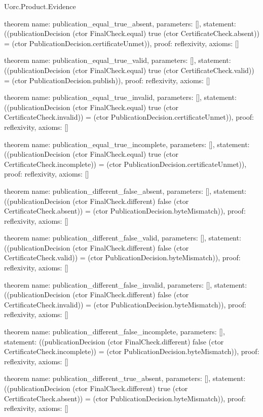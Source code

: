 \begin{lexlean}{Uorc.Product.Evidence}
\begin{semanticmodule}
theorem{
  name: publication_equal_true_absent,
  parameters: [],
  statement: ((publicationDecision (ctor FinalCheck.equal) true (ctor CertificateCheck.absent)) = (ctor PublicationDecision.certificateUnmet)),
  proof: reflexivity{},
  axioms: []
}

theorem{
  name: publication_equal_true_valid,
  parameters: [],
  statement: ((publicationDecision (ctor FinalCheck.equal) true (ctor CertificateCheck.valid)) = (ctor PublicationDecision.publish)),
  proof: reflexivity{},
  axioms: []
}

theorem{
  name: publication_equal_true_invalid,
  parameters: [],
  statement: ((publicationDecision (ctor FinalCheck.equal) true (ctor CertificateCheck.invalid)) = (ctor PublicationDecision.certificateUnmet)),
  proof: reflexivity{},
  axioms: []
}

theorem{
  name: publication_equal_true_incomplete,
  parameters: [],
  statement: ((publicationDecision (ctor FinalCheck.equal) true (ctor CertificateCheck.incomplete)) = (ctor PublicationDecision.certificateUnmet)),
  proof: reflexivity{},
  axioms: []
}

theorem{
  name: publication_different_false_absent,
  parameters: [],
  statement: ((publicationDecision (ctor FinalCheck.different) false (ctor CertificateCheck.absent)) = (ctor PublicationDecision.byteMismatch)),
  proof: reflexivity{},
  axioms: []
}

theorem{
  name: publication_different_false_valid,
  parameters: [],
  statement: ((publicationDecision (ctor FinalCheck.different) false (ctor CertificateCheck.valid)) = (ctor PublicationDecision.byteMismatch)),
  proof: reflexivity{},
  axioms: []
}

theorem{
  name: publication_different_false_invalid,
  parameters: [],
  statement: ((publicationDecision (ctor FinalCheck.different) false (ctor CertificateCheck.invalid)) = (ctor PublicationDecision.byteMismatch)),
  proof: reflexivity{},
  axioms: []
}

theorem{
  name: publication_different_false_incomplete,
  parameters: [],
  statement: ((publicationDecision (ctor FinalCheck.different) false (ctor CertificateCheck.incomplete)) = (ctor PublicationDecision.byteMismatch)),
  proof: reflexivity{},
  axioms: []
}

theorem{
  name: publication_different_true_absent,
  parameters: [],
  statement: ((publicationDecision (ctor FinalCheck.different) true (ctor CertificateCheck.absent)) = (ctor PublicationDecision.byteMismatch)),
  proof: reflexivity{},
  axioms: []
}


\end{semanticmodule}
\end{lexlean}
